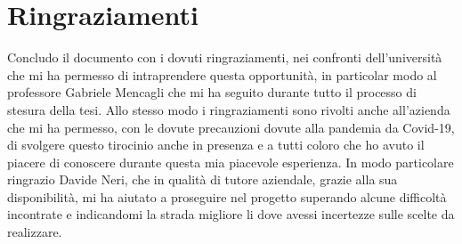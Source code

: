 \documentclass[a4paper,titlepage,12pt]{book}
\begin{document}
\section{\sffamily
Ringraziamenti}
Concludo il documento con i dovuti ringraziamenti, nei confronti dell'università che mi ha permesso di intraprendere questa opportunità, in particolar modo al professore Gabriele Mencagli che mi ha seguito durante tutto il processo di stesura della tesi. Allo stesso modo i ringraziamenti sono rivolti anche all'azienda che mi ha permesso, con le dovute precauzioni dovute alla pandemia da Covid-19, di svolgere questo tirocinio anche in presenza e a tutti coloro che ho avuto il piacere di conoscere durante questa mia piacevole esperienza. In modo particolare ringrazio Davide Neri, che in qualità di tutore aziendale, grazie alla sua disponibilità, mi ha aiutato a proseguire nel progetto superando alcune difficoltà incontrate e indicandomi la strada migliore li dove avessi incertezze sulle scelte da realizzare.
\end{document}
